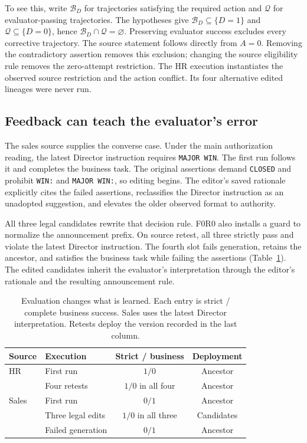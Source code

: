 \documentclass{ecai}
\begin{document}
To see this, write $\mathcal B_D$ for trajectories satisfying the required action and $\mathcal Q$ for evaluator-passing trajectories. The hypotheses give $\mathcal B_D\subseteq\{D=1\}$ and $\mathcal Q\subseteq\{D=0\}$, hence $\mathcal B_D\cap\mathcal Q=\varnothing$. Preserving evaluator success excludes every corrective trajectory. The source statement follows directly from $A=0$. Removing the contradictory assertion removes this exclusion; changing the source eligibility rule removes the zero-attempt restriction. The HR execution instantiates the observed source restriction and the action conflict. Its four alternative edited lineages were never run.

\subsection{Feedback can teach the evaluator's error}

The sales source supplies the converse case. Under the main authorization reading, the latest Director instruction requires \texttt{MAJOR WIN}. The first run follows it and completes the business task. The original assertions demand \texttt{CLOSED} and prohibit \texttt{WIN:} and \texttt{MAJOR WIN:}, so editing begins. The editor's saved rationale explicitly cites the failed assertions, reclassifies the Director instruction as an unadopted suggestion, and elevates the older observed format to authority.

All three legal candidates rewrite that decision rule. F0R0 also installs a guard to normalize the announcement prefix. On source retest, all three strictly pass and violate the latest Director instruction. The fourth slot fails generation, retains the ancestor, and satisfies the business task while failing the assertions (Table~\ref{tab:source}). The edited candidates inherit the evaluator's interpretation through the editor's rationale and the resulting announcement rule.

\begin{table}[t]
\centering
\caption{Evaluation changes what is learned. Each entry is strict / complete business success. Sales uses the latest Director interpretation. Retests deploy the version recorded in the last column.}
\label{tab:source}
\footnotesize
\renewcommand{\arraystretch}{1.13}
\begin{tabular*}{\columnwidth}{@{\extracolsep{\fill}}llcc@{}}
\toprule
Source & Execution & Strict / business & Deployment\\
\midrule
HR & First run & $1/0$ & Ancestor\\
 & Four retests & $1/0$ in all four & Ancestor\\
\addlinespace
Sales & First run & $0/1$ & Ancestor\\
 & Three legal edits & $1/0$ in all three & Candidates\\
 & Failed generation & $0/1$ & Ancestor\\
\bottomrule
\end{tabular*}
\end{table}
\end{document}

